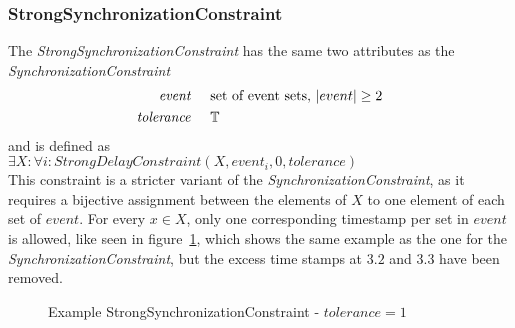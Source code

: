 	\subsubsection{StrongSynchronizationConstraint}
		The \emph{StrongSynchronizationConstraint} has the same two attributes as the \emph{SynchronizationConstraint}
		\begin{align*}
			\emph{event} & \hspace{.5cm}\text{set of event sets, $|event|\geq 2$}\\
			\emph{tolerance} & \hspace{.5cm}\mathbb{T}
		\end{align*}
		and is defined as\\[10pt]
		\begin{math}
			\exists X: \forall i: StrongDelayConstraint(X, event_i, 0, tolerance)
		\end{math}\\[10pt]
		This constraint is a stricter variant of the \emph{SynchronizationConstraint}, as it requires a bijective assignment between the elements of $X$ to one element of each set of $event$. For every $x\in X$, only one corresponding timestamp per set in $event$ is allowed, like seen in figure~\ref{fig:StrongSynchronizationConstraintExample}, which shows the same example as the one for the \emph{SynchronizationConstraint}, but the excess time stamps at $3.2$ and $3.3$ have been removed.
			\begin{figure}			
			\caption{Example StrongSynchronizationConstraint - $tolerance = 1$}
			\label{fig:StrongSynchronizationConstraintExample}
		\end{figure}
		

